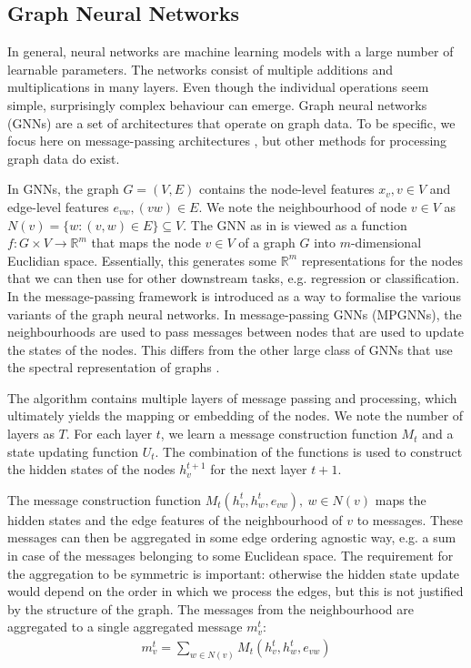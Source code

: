 \documentclass[english, 12pt, a4paper, sci, utf8, a-2b, online]{aaltothesis}
\newcommand{\R}{\mathbb{R}}
\begin{document}
\subsection{Graph Neural Networks}
\label{sec:gnns}

In general, neural networks are machine learning models with a large number of learnable parameters. The networks consist of multiple additions and multiplications in many layers. Even though the individual operations seem simple, surprisingly complex behaviour can emerge. Graph neural networks (GNNs) are a set of architectures that operate on graph data. To be specific, we focus here on message-passing architectures \cite{mpgnn-into-2017}, but other methods for processing graph data do exist.

In GNNs, the graph $G = (V, E)$ contains the node-level features $x_v, v\in V$ and edge-level features $e_{vw}, (vw) \in E$. We note the neighbourhood of node $v \in V$ as $N(v) = \{w : (v, w) \in E\}\subseteq V$. 
The GNN as in \cite{gnn-intro-2009} is viewed as a function $f:G \times V \to \R^m$ that maps the node $v \in V$ of a graph $G$ into $m$-dimensional Euclidian space. Essentially, this generates some $\R^m$ representations for the nodes that we can then use for other downstream tasks, e.g. regression or classification. In \cite{mpgnn-into-2017} the message-passing framework is introduced as a way to formalise the various variants of the graph neural networks.
In message-passing GNNs (MPGNNs), the neighbourhoods are used to pass messages between nodes that are used to update the states of the nodes. This differs from the other large class of GNNs that use the spectral representation of graphs \cite{gnn-review-2020}.

The algorithm contains multiple layers of message passing and processing, which ultimately yields the mapping or embedding of the nodes. We note the number of layers as $T$. For each layer $t$, we learn a message construction function $M_t$ and a state updating function $U_t$. The combination of the functions is used to construct the hidden states of the nodes $h_v^{t+1}$ for the next layer $t+1$.

The message construction function $M_t(h_v^t, h_w^t, e_{vw}),\ w \in N(v)$ maps the hidden states and the edge features of the neighbourhood of $v$ to messages. These messages can then be aggregated in some edge ordering agnostic way, e.g. a sum in case of the messages belonging to some Euclidean space. The requirement for the aggregation to be symmetric is important: otherwise the hidden state update would depend on the order in which we process the edges, but this is not justified by the structure of the graph. The messages from the neighbourhood are aggregated to a single aggregated message $m_v^t$:
\begin{align}
    m_v^t = \sum_{w \in N(v)}M_t(h_v^t, h_w^t, e_{vw})
\end{align}
\end{document}
